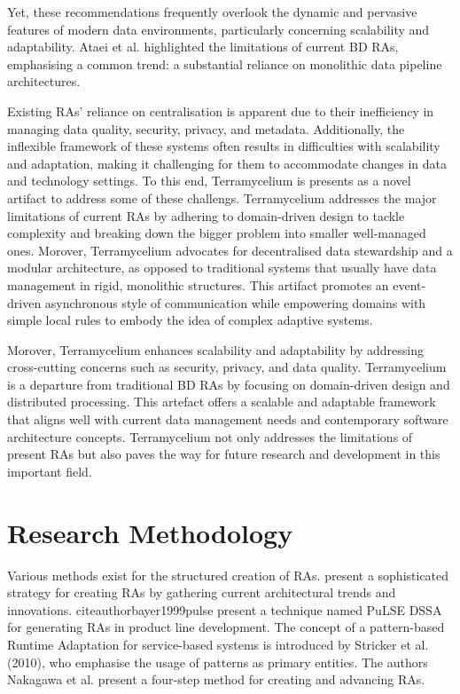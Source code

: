 \documentclass[journal]{IEEEtran}
\begin{document}
Yet, these recommendations frequently overlook the dynamic and pervasive features of modern data environments, particularly concerning scalability and adaptability. Ataei et al. \cite{ataei2022state} highlighted the limitations of current BD RAs, emphasising a common trend: a substantial reliance on monolithic data pipeline architectures. 


Existing RAs' reliance on centralisation is apparent due to their inefficiency in managing data quality, security, privacy, and metadata. Additionally, the inflexible framework of these systems often results in difficulties with scalability and adaptation, making it challenging for them to accommodate changes in data and technology settings. To this end, Terramycelium is presents as a novel artifact to address some of these challengs. Terramycelium addresses the major limitations of current RAs by adhering to domain-driven design to tackle complexity and breaking down the bigger problem into smaller well-managed ones. Morover, Terramycelium advocates for decentralised data stewardship and a modular architecture, as opposed to traditional systems that usually have data management in rigid, monolithic structures. This artifact promotes an event-driven asynchronous style of communication while empowering domains with simple local rules to embody the idea of complex adaptive systems. 

Morover, Terramycelium enhances scalability and adaptability by addressing cross-cutting concerns such as security, privacy, and data quality. Terramycelium is a departure from traditional BD RAs by focusing on domain-driven design and distributed processing. This artefact offers a scalable and adaptable framework that aligns well with current data management needs and contemporary software architecture concepts. Terramycelium not only addresses the limitations of present RAs but also paves the way for future research and development in this important field.

\section{Research Methodology}

Various methods exist for the structured creation of RAs. \cite{Cloutier2010} present a sophisticated strategy for creating RAs by gathering current architectural trends and innovations. citeauthorbayer1999pulse present a technique named PuLSE DSSA for generating RAs in product line development. The concept of a pattern-based Runtime Adaptation for service-based systems is introduced by Stricker et al. (2010), who emphasise the usage of patterns as primary entities. The authors Nakagawa et al. present a four-step method for creating and advancing RAs. 
\end{document}
